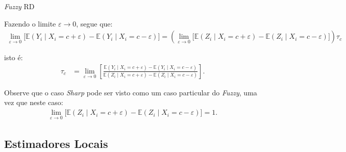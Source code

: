 \documentclass[aspectratio=1610, 10pt]{beamer}
\begin{document}
\begin{frame}{\textit{Fuzzy} RD}

 \justifying
 Fazendo o limite $\varepsilon \rightarrow 0$, segue que:
    \begin{align*}
        \lim_{\varepsilon \rightarrow 0} \big[ \mathbb{E}(Y_i \mid X_i = c + \varepsilon) - \mathbb{E}(Y_i \mid X_i = c - \varepsilon) \big] = \left(\lim_{\varepsilon \rightarrow 0} \big[ \mathbb{E}(Z_i \mid X_i = c + \varepsilon) - \mathbb{E}(Z_i \mid X_i = c - \varepsilon) \big] \right) \tau_c
    \end{align*}

    \vspace{0.15cm}
    isto é:
    \begin{align*}
        \tau_c &= \lim_{\varepsilon \rightarrow 0} \left[ \frac{\mathbb{E}(Y_i \mid X_i = c + \varepsilon) - \mathbb{E}(Y_i \mid X_i = c - \varepsilon)}{\mathbb{E}(Z_i \mid X_i = c + \varepsilon) - \mathbb{E}(Z_i \mid X_i = c - \varepsilon)} \right].
    \end{align*}

    \vspace{0.15cm}
    Observe que o caso \textit{Sharp} pode ser visto como um caso particular do \textit{Fuzzy}, uma vez que neste caso:
    \begin{align*}
        \lim_{\varepsilon \rightarrow 0} \big[ \mathbb{E}(Z_i \mid X_i = c + \varepsilon) - \mathbb{E}(Z_i \mid X_i = c - \varepsilon) \big] = 1.
    \end{align*}
\end{frame}

\subsection{Estimadores Locais}
\end{document}
